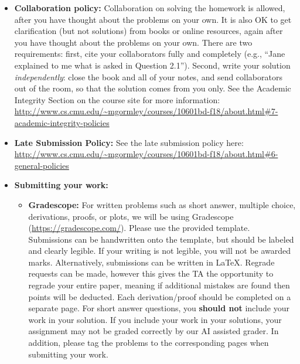 \documentclass[12pt]{article}
\begin{document}
\begin{itemize}
\item \textbf{Collaboration policy:} Collaboration on solving the homework is allowed, after you have thought about the problems on your own. It is also OK to get clarification (but not solutions) from books or online resources, again after you have thought about the problems on your own. There are two requirements: first, cite your collaborators fully and completely (e.g., ``Jane explained to me what is asked in Question 2.1''). Second, write your solution {\em independently}: close the book and all of your notes, and send collaborators out of the room, so that the solution comes from you only.  See the Academic Integrity Section on the course site for more information: \url{http://www.cs.cmu.edu/~mgormley/courses/10601bd-f18/about.html#7-academic-integrity-policies}

\item\textbf{Late Submission Policy:} See the late submission policy here: \url{http://www.cs.cmu.edu/~mgormley/courses/10601bd-f18/about.html#6-general-policies}

\item\textbf{Submitting your work:} 

\begin{itemize}

\item \textbf{Gradescope:} For written problems such as short answer, multiple choice, derivations, proofs, or plots, we will be using Gradescope (\url{https://gradescope.com/}). Please use the provided template. Submissions can be handwritten onto the template, but should be labeled and clearly legible. If your writing is not legible, you will not be awarded marks. Alternatively, submissions can be written in LaTeX. Regrade requests can be made, however this gives the TA the opportunity to regrade your entire paper, meaning if additional mistakes are found then points will be deducted.
Each derivation/proof should be completed on a separate page. For short answer questions, you \textbf{should not} include your work in your solution.  If you include your work in your solutions, your assignment may not be graded correctly by our AI assisted grader. In addition, please tag the problems to the corresponding pages when submitting your work.

\end{itemize}


\end{itemize}
\end{document}
